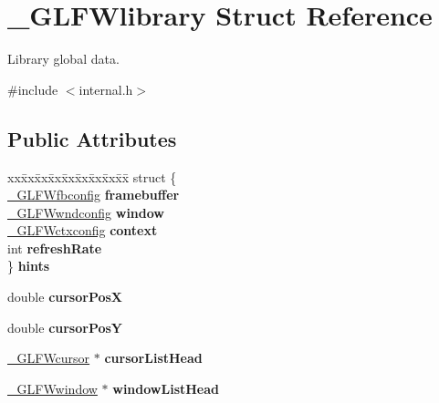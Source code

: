 \hypertarget{struct__GLFWlibrary}{}\section{\+\_\+\+G\+L\+F\+Wlibrary Struct Reference}
\label{struct__GLFWlibrary}


Library global data.  




{\ttfamily \#include $<$internal.\+h$>$}

\subsection*{Public Attributes}
\begin{DoxyCompactItemize}
\item 
\hypertarget{struct__GLFWlibrary_a9c80c51dd73fa58c283d96850757053f}{}\begin{tabbing}
xx\=xx\=xx\=xx\=xx\=xx\=xx\=xx\=xx\=\kill
struct \{\\
\>\hyperlink{struct__GLFWfbconfig}{\_GLFWfbconfig} {\bfseries framebuffer}\\
\>\hyperlink{struct__GLFWwndconfig}{\_GLFWwndconfig} {\bfseries window}\\
\>\hyperlink{struct__GLFWctxconfig}{\_GLFWctxconfig} {\bfseries context}\\
\>int {\bfseries refreshRate}\\
\} {\bfseries hints}\label{struct__GLFWlibrary_a9c80c51dd73fa58c283d96850757053f}
\\

\end{tabbing}\item 
\hypertarget{struct__GLFWlibrary_a010b60fc41664415b32c57b1bbc2aebb}{}double {\bfseries cursor\+Pos\+X}\label{struct__GLFWlibrary_a010b60fc41664415b32c57b1bbc2aebb}

\item 
\hypertarget{struct__GLFWlibrary_ac23a477778bef6654c60cca20dc8ea34}{}double {\bfseries cursor\+Pos\+Y}\label{struct__GLFWlibrary_ac23a477778bef6654c60cca20dc8ea34}

\item 
\hypertarget{struct__GLFWlibrary_a8e4a4c3a75390dc4a6f649a71ab57a1e}{}\hyperlink{struct__GLFWcursor}{\+\_\+\+G\+L\+F\+Wcursor} $\ast$ {\bfseries cursor\+List\+Head}\label{struct__GLFWlibrary_a8e4a4c3a75390dc4a6f649a71ab57a1e}

\item 
\hypertarget{struct__GLFWlibrary_a7859e386c1ff4ed65e13e6ba1e189cfe}{}\hyperlink{struct__GLFWwindow}{\+\_\+\+G\+L\+F\+Wwindow} $\ast$ {\bfseries window\+List\+Head}\label{struct__GLFWlibrary_a7859e386c1ff4ed65e13e6ba1e189cfe}


\end{DoxyCompactItemize}
